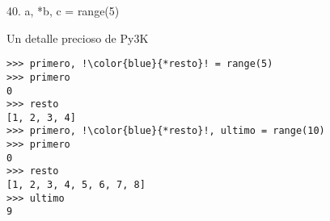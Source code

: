 \begin{frame}[fragile]{40. a, *b, c = range(5)}
  \begin{exampleblock}
    {\centering Un detalle precioso de Py3K}
    \small
    \begin{lstlisting}[escapechar=!]
>>> primero, !\color{blue}{*resto}! = range(5)
>>> primero
0
>>> resto
[1, 2, 3, 4]
>>> primero, !\color{blue}{*resto}!, ultimo = range(10)
>>> primero
0
>>> resto
[1, 2, 3, 4, 5, 6, 7, 8]
>>> ultimo
9
    \end{lstlisting}
  \end{exampleblock}
\end{frame}
